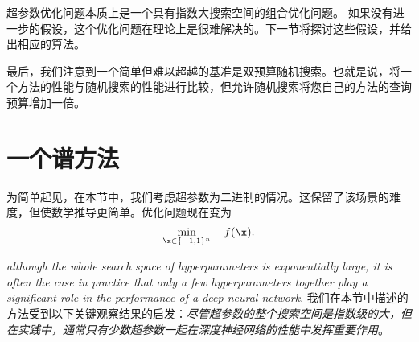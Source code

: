 超参数优化问题本质上是一个具有指数大搜索空间的组合优化问题。
如果没有进一步的假设，这个优化问题在理论上是很难解决的。下一节将探讨这些假设，并给出相应的算法。

最后，我们注意到一个简单但难以超越的基准是双预算随机搜索。也就是说，将一个方法的性能与随机搜索的性能进行比较，但允许随机搜索将您自己的方法的查询预算增加一倍。

\section{
	一个谱方法
	} 

为简单起见，在本节中，我们考虑超参数为二进制的情况。这保留了该场景的难度，但使数学推导更简单。优化问题现在变为
\begin{equation}
	\label{hyp_opt}
    \min_{\x \in \{-1, 1\}^n} \quad f(\x). 
\end{equation}


\emph{although the whole search space of hyperparameters is exponentially large, it is often the case in practice that only a few hyperparameters together play a significant role in the performance of a deep neural network}.
我们在本节中描述的方法受到以下关键观察结果的启发：\emph{尽管超参数的整个搜索空间是指数级的大，但在实践中，通常只有少数超参数一起在深度神经网络的性能中发挥重要作用}。

